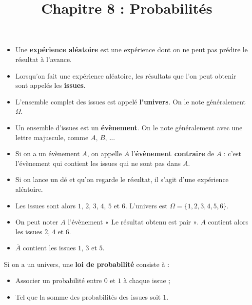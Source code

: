 \documentclass[
	classe=$2^{de}$
]{coursclass}
\title{Chapitre 8 : Probabilités}
\author{}
\date{}
\begin{document}
\maketitle

\begin{definition}
	\begin{itemize}
		\item Une \textbf{expérience aléatoire} est une expérience dont on ne peut pas prédire le résultat à l'avance.
		\item Lorsqu'on fait une expérience aléatoire, les résultats que l'on peut obtenir sont appelés les \textbf{issues}.
		\item L'ensemble complet des issues est appelé \textbf{l'univers}. On le note généralement $Ω$.
		\item Un ensemble d'issues est un \textbf{évènement}. On le note généralement avec une lettre majuscule, comme $A$, $B$, ...
		\item Si on a un évènement $A$, on appelle $\overline{A}$ l'\textbf{évènement contraire} de $A$ : c'est l'évènement qui contient les issues qui ne sont pas dans $A$.
	\end{itemize}
\end{definition}

\begin{exemple}
	\begin{itemize}
		\item Si on lance un dé et qu'on regarde le résultat, il s'agit d'une expérience aléatoire.
		\item Les issues sont alors $1$, $2$, $3$, $4$, $5$ et $6$. L'univers est $Ω = \{1, 2, 3, 4, 5, 6\}$.
		\item On peut noter $A$ l'évènement « Le résultat obtenu est pair ». $A$ contient alors les issues $2$, $4$ et $6$.
		\item $\overline{A}$ contient les issues $1$, $3$ et $5$.
	\end{itemize}
\end{exemple}

\begin{definition}
	Si on a un univers, une \textbf{loi de probabilité} consiste à :
	\begin{itemize}
		\item Associer un probabilité entre $0$ et $1$ à chaque issue ;
		\item Tel que la somme des probabilités des issues soit $1$.
	\end{itemize}
\end{definition}
\end{document}
